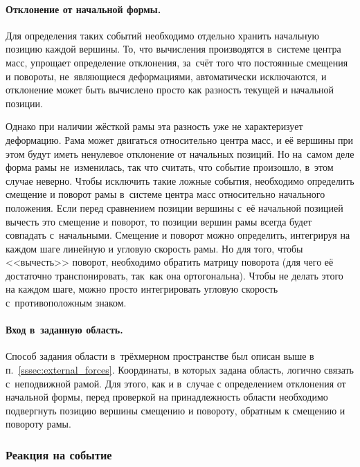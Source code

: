 \documentclass[a4paper, 14pt, titlepage]{extarticle}
\begin{document}
        \paragraph{Отклонение от начальной формы.}
        Для определения таких событий необходимо отдельно хранить начальную позицию каждой вершины.
        То, что вычисления производятся в~системе центра масс, упрощает определение
        отклонения, за~счёт того что постоянные смещения и повороты, не~являющиеся деформациями,
        автоматически исключаются, и отклонение может быть вычислено просто как разность текущей и
        начальной позиции.

        Однако при наличии жёсткой рамы эта разность уже не характеризует деформацию. Рама может
        двигаться относительно центра масс, и её вершины при этом будут иметь ненулевое отклонение
        от начальных позиций. Но на~самом деле форма рамы не~изменилась, так что считать, что событие
        произошло, в~этом случае неверно. Чтобы исключить такие ложные события, необходимо определить смещение и поворот
        рамы в~системе центра масс относительно начального положения. Если перед сравнением позиции
        вершины с~её начальной позицией вычесть это смещение и поворот, то позиции вершин рамы
        всегда будет совпадать с~начальными. Смещение и поворот можно определить, интегрируя на
        каждом шаге линейную и угловую скорость рамы. Но для того, чтобы <<вычесть>> поворот,
        необходимо обратить матрицу поворота (для чего её достаточно транспонировать, так~как она
        ортогональна). Чтобы не делать этого на каждом шаге, можно просто интегрировать угловую
        скорость с~противоположным знаком.

        \paragraph{Вход в~заданную область.}
        Способ задания области в~трёхмерном пространстве был описан выше в п.~\ref{sssec:external_forces}.
        Координаты, в которых задана область, логично связать с~неподвижной рамой. Для этого, как и
        в~случае с определением отклонения от начальной формы, перед проверкой на принадлежность
        области необходимо подвергнуть позицию вершины смещению и повороту, обратным к смещению и
        повороту рамы.

      \subsubsection{Реакция на событие}
\end{document}

